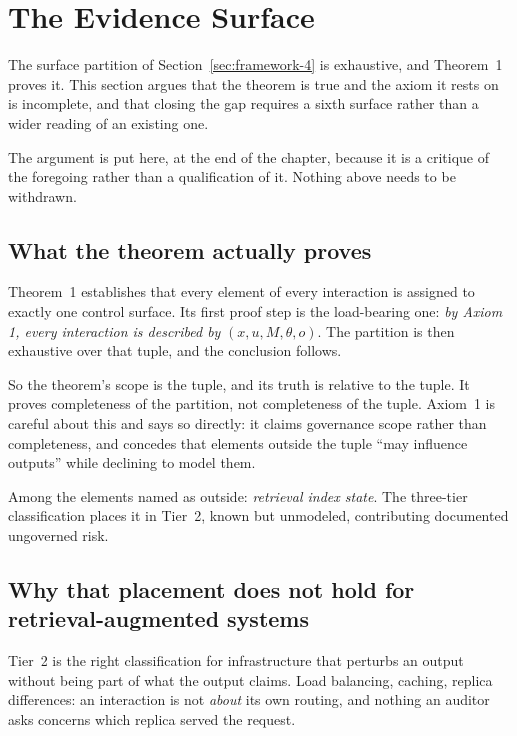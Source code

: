 \section{The Evidence Surface}
\label{sec:framework-15}

The surface partition of Section~\ref{sec:framework-4} is exhaustive, and
Theorem~1 proves it. This section argues that the theorem is true and the axiom it
rests on is incomplete, and that closing the gap requires a sixth surface rather than
a wider reading of an existing one.

The argument is put here, at the end of the chapter, because it is a critique of the
foregoing rather than a qualification of it. Nothing above needs to be withdrawn.

\subsection{What the theorem actually proves}

Theorem~1 establishes that every element of every interaction is assigned to exactly
one control surface. Its first proof step is the load-bearing one: \emph{by Axiom 1,
every interaction is described by} $(x, u, M, \theta, o)$. The partition is then
exhaustive over that tuple, and the conclusion follows.

So the theorem's scope is the tuple, and its truth is relative to the tuple. It proves
completeness of the partition, not completeness of the tuple. Axiom~1 is careful about
this and says so directly: it claims governance scope rather than completeness, and
concedes that elements outside the tuple ``may influence outputs'' while declining to
model them.

Among the elements named as outside: \emph{retrieval index state}. The three-tier
classification places it in Tier~2, known but unmodeled, contributing documented
ungoverned risk.

\subsection{Why that placement does not hold for retrieval-augmented systems}

Tier~2 is the right classification for infrastructure that perturbs an output without
being part of what the output claims. Load balancing, caching, replica differences: an
interaction is not \emph{about} its own routing, and nothing an auditor asks concerns
which replica served the request.

